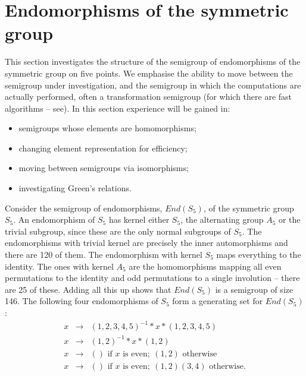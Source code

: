 \documentclass{ws-p8-50x6-00}
\theoremstyle{plain} \newtheorem{Thm}{Theorem}
\theoremstyle{plain} \newtheorem{Cor}{Corollary}
\theoremstyle{plain} \newtheorem{Lemma}{Lemma}
\theoremstyle{plain} \newtheorem{Prop}{Proposition}
\theoremstyle{plain} \newtheorem{Ex}{Exercise}
\begin{document}
\section{Endomorphisms of the symmetric group}
This section investigates the structure of 
the semigroup of endomorphisms of the symmetric group on five points.
We emphasise the ability to move between the semigroup
under investigation, and the semigroup in which the computations
are actually performed, often a transformation semigroup 
(for which there are fast algorithms -- see\cite{linton_tsemi}).
In this section experience will be gained in:
\begin{itemize}
\item semigroups whose elements are homomorphisms;
\item changing element representation for efficiency;
\item moving between semigroups via isomorphisms;
\item investigating Green's relations.
\end{itemize}

Consider the semigroup of endomorphisms, $End(S_5)$, 
of the symmetric group $S_5$.
An endomorphism of $S_5$ has kernel either $S_5$, the alternating
group  $A_5$ 
or the trivial subgroup,
since these are the only normal subgroups of $S_5$.
The endomorphisms with trivial kernel are precisely the inner automorphisms 
and there are 120 of them.
The endomorphism with kernel $S_5$ 
maps everything to the identity.
The ones with kernel $A_5$ are the homomorphisms mapping all even permutations
to the identity and odd permutations to a single involution --
there are 25 of these. 
Adding all this up shows that $End(S_5)$ is a semigroup of size 146. 
The following four endomorphisms of $S_5$ form a  generating 
set for $End(S_5)$:
\begin{eqnarray*}
x & \rightarrow & (1,2,3,4,5)^{-1} * x * (1,2,3,4,5)\\
x & \rightarrow & (1,2)^{-1} * x * (1,2)\\
x & \rightarrow & () \mbox{ if }x\mbox{ is even};\ (1,2) \mbox{ otherwise }\\
x & \rightarrow & 
                () \mbox{ if } x \mbox{ is even};\ (1,2)(3,4)\mbox{ otherwise}.
\end{eqnarray*}
\end{document}
